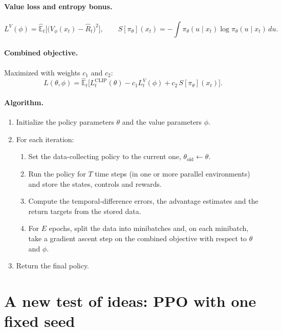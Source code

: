 \documentclass[11pt]{article}
\begin{document}
\paragraph{Value loss and entropy bonus.}
\[
  L^{V}(\phi) = \hat{\mathbb{E}}_t\Big[\big(V_\phi(x_t) - \hat R_t\big)^2\Big], \qquad
  S[\pi_\theta](x_t) = -\int \pi_\theta(u \mid x_t) \log \pi_\theta(u \mid x_t)\, du .
\]

\paragraph{Combined objective.} Maximized with weights $c_1$ and $c_2$:
\[
  L(\theta, \phi) = \hat{\mathbb{E}}_t\Big[ L^{\mathrm{CLIP}}_t(\theta) - c_1 L^{V}_t(\phi)
  + c_2\, S[\pi_\theta](x_t) \Big].
\]

\paragraph{Algorithm.}
\begin{enumerate}
  \item Initialize the policy parameters $\theta$ and the value parameters $\phi$.
  \item For each iteration:
    \begin{enumerate}
      \item Set the data-collecting policy to the current one, $\theta_{\mathrm{old}} \leftarrow \theta$.
      \item Run the policy for $T$ time steps (in one or more parallel environments) and store the
        states, controls and rewards.
      \item Compute the temporal-difference errors, the advantage estimates and the return targets
        from the stored data.
      \item For $E$ epochs, split the data into minibatches and, on each minibatch, take a gradient
        ascent step on the combined objective with respect to $\theta$ and $\phi$.
    \end{enumerate}
  \item Return the final policy.
\end{enumerate}

\section{A new test of ideas: PPO with one fixed seed}
\label{sec:ppo-fixed-seed}
\end{document}
